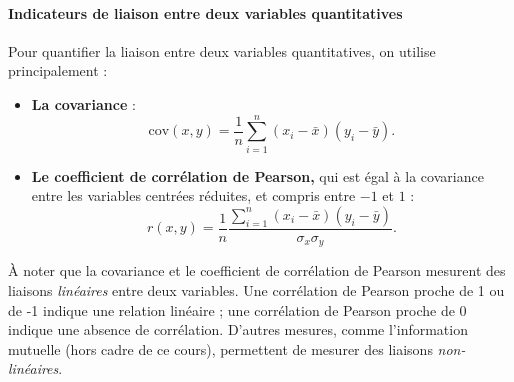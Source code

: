 \paragraph{Indicateurs de liaison entre deux variables quantitatives}
Pour quantifier la liaison entre deux variables quantitatives, on utilise
principalement :
\begin{itemize}
	\item \textbf{La covariance} :
	\[\text{cov}(x, y) = \frac1n \sum_{i=1}^n (x_i - \bar x) (y_i - \bar y).\]
	\item \textbf{Le coefficient de corrélation de Pearson,} qui est égal à la
	covariance entre les variables centrées réduites, et compris entre $-1$ et $1$ :
	\[r(x, y) = \frac1n \frac{\sum_{i=1}^n (x_i - \bar x) (y_i - \bar y)}{\sigma_x \sigma_y}.\]
\end{itemize}

À noter que la covariance et le coefficient de corrélation de Pearson mesurent
des liaisons \textit{linéaires} entre deux variables. Une corrélation de
Pearson proche de 1 ou de -1 indique une relation linéaire ; une corrélation de
Pearson proche de 0 indique une absence de corrélation. D'autres mesures, comme
l'information mutuelle (hors cadre de ce cours), permettent de mesurer des
liaisons \textit{non-linéaires}. 

